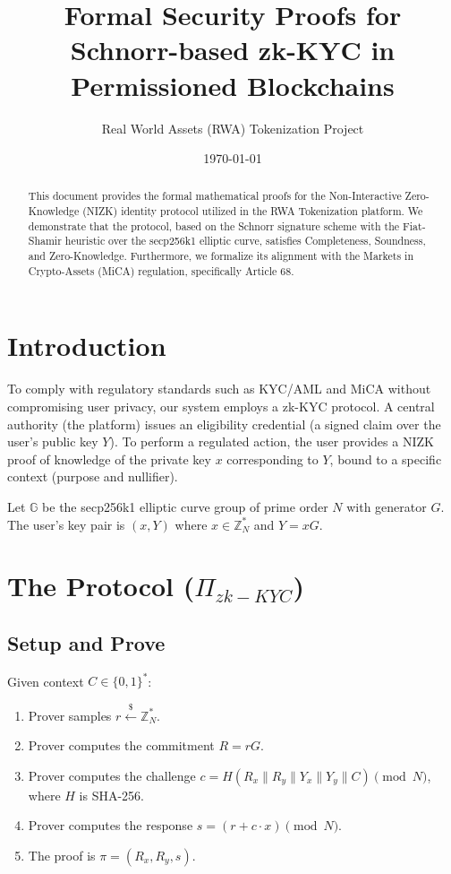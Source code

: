 \documentclass[11pt,a4paper]{article}
\title{Formal Security Proofs for Schnorr-based zk-KYC in Permissioned Blockchains}
\author{Real World Assets (RWA) Tokenization Project}
\date{\today}
\begin{document}
\maketitle

\begin{abstract}
This document provides the formal mathematical proofs for the Non-Interactive Zero-Knowledge (NIZK) identity protocol utilized in the RWA Tokenization platform. We demonstrate that the protocol, based on the Schnorr signature scheme with the Fiat-Shamir heuristic over the secp256k1 elliptic curve, satisfies Completeness, Soundness, and Zero-Knowledge. Furthermore, we formalize its alignment with the Markets in Crypto-Assets (MiCA) regulation, specifically Article 68.
\end{abstract}

\section{Introduction}
To comply with regulatory standards such as KYC/AML and MiCA without compromising user privacy, our system employs a zk-KYC protocol. A central authority (the platform) issues an eligibility credential (a signed claim over the user's public key $Y$). To perform a regulated action, the user provides a NIZK proof of knowledge of the private key $x$ corresponding to $Y$, bound to a specific context (purpose and nullifier).

Let $\mathbb{G}$ be the secp256k1 elliptic curve group of prime order $N$ with generator $G$.
The user's key pair is $(x, Y)$ where $x \in \mathbb{Z}_N^*$ and $Y = xG$.

\section{The Protocol ($\Pi_{zk-KYC}$)}
\subsection{Setup and Prove}
Given context $C \in \{0, 1\}^*$:
\begin{enumerate}
    \item Prover samples $r \xleftarrow{\$} \mathbb{Z}_N^*$.
    \item Prover computes the commitment $R = rG$.
    \item Prover computes the challenge $c = H(R_x \parallel R_y \parallel Y_x \parallel Y_y \parallel C) \pmod N$, where $H$ is SHA-256.
    \item Prover computes the response $s = (r + c \cdot x) \pmod N$.
    \item The proof is $\pi = (R_x, R_y, s)$.
\end{enumerate}
\end{document}
